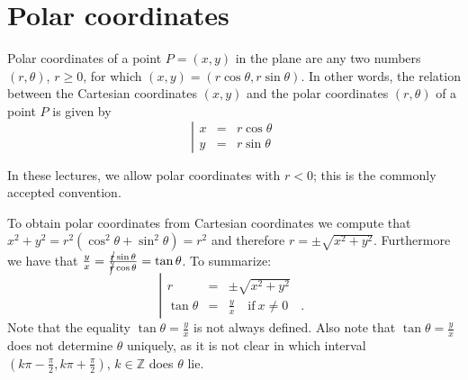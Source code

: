 \documentclass[12pt]{book}
\renewcommand{\optionalDisplay}[1]{}
\begin{document}
\optionalDisplay{
\psset{xunit=1cm,yunit=1cm}
\begin{pspicture}(-1,-1)(4,4.3)
\psaxes[ ticks=none, arrows={->}](0,0)(4,4)
\rput[b](0,4.1){\tiny$y$}
\rput[b](4.1,0){\tiny$x$}

\psplot[linecolor=blue, plotstyle=curve]{0.2}{4} { x 2 div x 180 mul  sin 1 add  mul 1 add x 3 div  sub   }  %
\psplot[linecolor=black!50, plotpoints=11,plotstyle=line]{0.2}{4}{ x 2 div x 180 mul  sin 1 add  mul 1 add x 3 div  sub   }
\psline[linecolor=red!50](2.1,1.674467844)(2.1,2.650886477)(2.48,2.650886477)
\rput[t](1.9,2.3){\tiny$\diff y$}
\rput[t](2.28,2.85){\tiny$\diff x$}


\rput[t](1,1.8){\tiny$(x(t), y(t))$}
\pscurve[arrows={->}, linestyle=dotted](1,1.8)(1.3, 1.5)(2.1,1.674467844)
\pscurve[arrows={->}, linestyle=dotted](2,4)(2.5, 3.55)(2.48,2.650886477)

\rput[b](2,4){\tiny$(x(t+\Delta), y(t+\Delta))$}

\end{pspicture}
}

\section{Polar coordinates}
Polar coordinates of a point $P=(x,y)$ in the plane are any two numbers $(r, \theta)$, $r\geq 0$, for which $(x,y)=(r\cos\theta, r\sin \theta)$. In other words, the relation between the Cartesian coordinates $(x,y)$ and the polar coordinates $(r,\theta)$ of a point $P$ is given by
\[
\left|\begin{array}{rcl}
x&=&r\cos \theta\\
y&=&r\sin\theta
\end{array}\right.
\]

In these lectures, we allow polar coordinates with $ r<0$; this is the commonly accepted convention.

To obtain polar coordinates from Cartesian coordinates we compute that $x^2+y^2= r^2(\cos^2 \theta+\sin^2\theta)=r^2$ and therefore $r=\pm\sqrt{x^2+y^2}$. Furthermore we have that $\frac{y}{x}= \frac{\cancel{r}\sin \theta}{\cancel{r}\cos \theta}=\tan \theta$. To summarize:
\[
\left|\begin{array}{rcl}
r&=&\pm\sqrt{x^2+y^2}\\
\tan\theta&=&\frac{y}{x} \quad \mathrm{if~}x\neq 0 \quad .
\end{array}\right.
\]
Note that the equality $\tan \theta = \frac{y}{x}$ is not always defined. Also note that  $\tan \theta=\frac{y}{x}$ does not determine $\theta$ uniquely, as it is not clear in which interval $(k\pi -\frac{\pi}{2}, k\pi+\frac{\pi}{2})$, $k\in \mathbb Z$ does $\theta$ lie.
\end{document}
